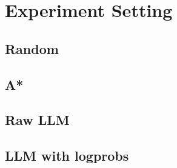 \chapter{Experiment Setting}
\label{cha:examples}

\section{Random}
\lipsum[1]

\section{A*}
\lipsum[1]
\section{Raw LLM}
\lipsum[1]
\section{LLM with logprobs}
\lipsum[1]